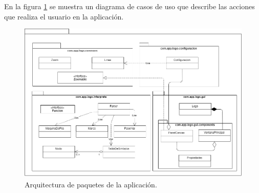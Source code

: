 En la figura \ref{fig:diagram:package_diagram} se muestra un diagrama de casos de uso que describe las acciones que
realiza el usuario en la aplicación.

\begin{figure}[H]
	\begin{center}
		\includegraphics[scale=.6]{images/diagrama_paquetes/img_PackageDiagram}
		\caption{Arquitectura de paquetes de la aplicación.}
		\label{fig:diagram:package_diagram}
	\end{center}
\end{figure}